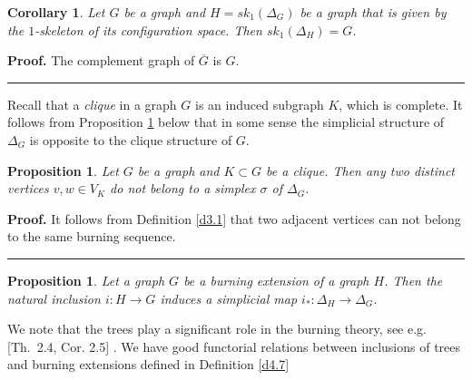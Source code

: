 \documentclass[a4paper, 11pt]{article}
\newtheorem{proposition}[theorem]{Proposition}
\newtheorem{corollary}[theorem]{Corollary}
\newenvironment{proof}[1][Proof]{\textbf{#1.} }{\ \rule{0.5em}{0.5em}}
\begin{document}
\begin{corollary}\label{c4.12}  Let  $G$ be a graph and  $H=sk_1(\Delta_G)$  be a graph that is given by  the $1$-skeleton of its configuration space.  Then $sk_1(\Delta_H)=G$.  
\end{corollary} 
\begin{proof} The complement graph of $\overline G$ is $G$.
\end{proof} 

\bigskip

Recall that a \emph{clique}   in a graph $G$ is an induced subgraph $K$, which is complete. 
It follows from Proposition \ref{p4.13} below  that  in some sense the simplicial structure of $\Delta_G$  is opposite to the clique structure of  $G$.  


\begin{proposition}\label{p4.13} Let $G$ be a graph and $K\subset G$ be a clique. Then any two distinct vertices $v, w\in V_K$ do not belong to a simplex $\sigma$ of $\Delta_G$. 
\end{proposition} 
\begin{proof} It follows from Definition \ref{d3.1} that two adjacent vertices can not belong to the same burning sequence. 
\end{proof}



\begin{proposition}\label{p4.15} Let a graph $G$ be  a burning extension of a graph $H$. Then the natural inclusion  $i\colon H\to G$ induces a simplicial map  $i_*\colon \Delta_H\longrightarrow \Delta_G$.
\end{proposition}

We note that the trees play a significant role in the burning theory, see e.g. \cite{Bonato_0}[Th.~2.4, Cor. 2.5] . 
We have good functorial relations between inclusions of trees  and burning extensions  defined in Definition \ref{d4.7} 
\end{document}
